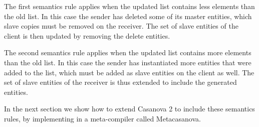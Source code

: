 \noindent
The first semantics rule applies when the updated list contains less elements than the old list. In this case the sender has deleted some of its master entities, which slave copies must be removed on the receiver. The set of slave entities of the client is then updated by removing the delete entities.

The second semantics rule applies when the updated list contains more elements than the old list. In this case the sender has instantiated more entities that were added to the list, which must be added as slave entities on the client as well. The set of slave entities of the receiver is thus extended to include the generated entities.

\vspace{0.5cm}
In the next section we show how to extend Casanova 2 to include these semantics rules, by implementing in a meta-compiler called Metacasanova.